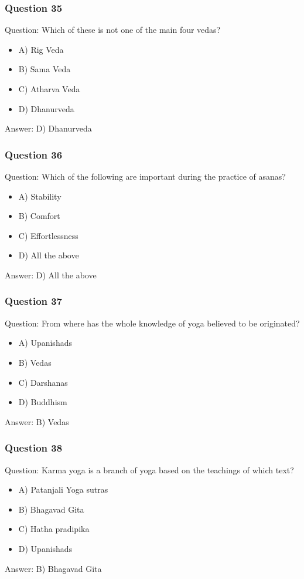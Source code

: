\begin{frame}[fragile]\frametitle{Question 35}
Question: Which of these is not one of the main four vedas?
\begin{itemize}
\item A) Rig Veda
\item B) Sama Veda
\item C) Atharva Veda
\item D) Dhanurveda
\end{itemize}
Answer: D) Dhanurveda
\end{frame}

\begin{frame}[fragile]\frametitle{Question 36}
Question: Which of the following are important during the practice of asanas?
\begin{itemize}
\item A) Stability
\item B) Comfort
\item C) Effortlessness
\item D) All the above
\end{itemize}
Answer: D) All the above
\end{frame}

\begin{frame}[fragile]\frametitle{Question 37}
Question: From where has the whole knowledge of yoga believed to be originated?
\begin{itemize}
\item A) Upanishads
\item B) Vedas
\item C) Darshanas
\item D) Buddhism
\end{itemize}
Answer: B) Vedas
\end{frame}

\begin{frame}[fragile]\frametitle{Question 38}
Question: Karma yoga is a branch of yoga based on the teachings of which text?
\begin{itemize}
\item A) Patanjali Yoga sutras
\item B) Bhagavad Gita
\item C) Hatha pradipika
\item D) Upanishads
\end{itemize}
Answer: B) Bhagavad Gita
\end{frame}


